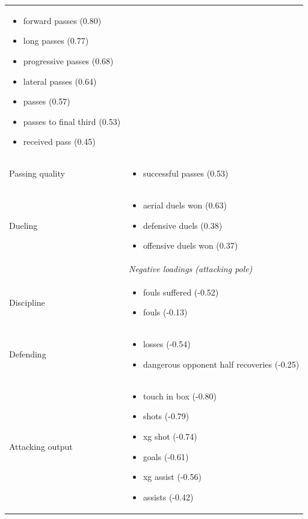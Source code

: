 \begin{longtable}{p{2.6cm}p{13cm}}
\begin{itemize}[nosep,leftmargin=1.1em,topsep=1pt]
    \item forward passes (0.80)
    \item long passes (0.77)
    \item progressive passes (0.68)
    \item lateral passes (0.64)
    \item passes (0.57)
    \item passes to final third (0.53)
    \item received pass (0.45)
  \end{itemize}\\
Passing quality & \begin{itemize}[nosep,leftmargin=1.1em,topsep=1pt]
    \item successful passes (0.53)
  \end{itemize}\\
Dueling & \begin{itemize}[nosep,leftmargin=1.1em,topsep=1pt]
    \item aerial duels won (0.63)
    \item defensive duels (0.38)
    \item offensive duels won (0.37)
  \end{itemize}\\[4pt]
 & \textit{Negative loadings (attacking pole)}\\
Discipline & \begin{itemize}[nosep,leftmargin=1.1em,topsep=1pt]
    \item fouls suffered (-0.52)
    \item fouls (-0.13)
  \end{itemize}\\
Defending & \begin{itemize}[nosep,leftmargin=1.1em,topsep=1pt]
    \item losses (-0.54)
    \item dangerous opponent half recoveries (-0.25)
  \end{itemize}\\
Attacking output & \begin{itemize}[nosep,leftmargin=1.1em,topsep=1pt]
    \item touch in box (-0.80)
    \item shots (-0.79)
    \item xg shot (-0.74)
    \item goals (-0.61)
    \item xg assist (-0.56)
    \item assists (-0.42)

\end{itemize}
\end{longtable}

